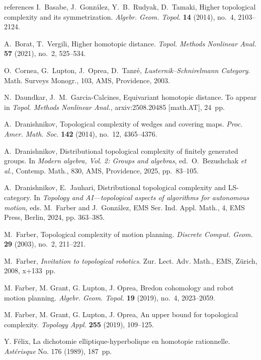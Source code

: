 \documentclass[amscd,amssymb,verbatim,10pt]{amsart}
\numberwithin{equation}{section}
\theoremstyle{plain}
\theoremstyle{definition}
\begin{document}
\begin{thebibliography}{references}
 I.~Basabe, J.~Gonz\'alez, Y.~B.~Rudyak, D.~Tamaki, Higher topological complexity and its symmetrization. \textit{Algebr. Geom. Topol.} \textbf{14} (2014), no.~4, 2103--2124.

 A.~Borat, T.~Vergili, Higher homotopic distance. \emph{Topol. Methods Nonlinear Anal.} \textbf{57} (2021), no.~2, 525--534.

 O.~Cornea, G.~Lupton, J.~Oprea, D.~Tanré, \textit{Lusternik--Schnirelmann Category}. Math. Surveys Monogr., 103, AMS, Providence, 2003.

 N.~Daundkar, J.~M.~Garcia-Calcines, Equivariant homotopic distance. To appear in \emph{Topol. Methods Nonlinear Anal.}, arxiv:2508.20485 [math.AT], 24~pp.

 A.~Dranishnikov, Topological complexity of wedges and covering maps. \emph{Proc. Amer. Math. Soc.} \textbf{142} (2014), no.~12, 4365--4376.

 A.~Dranishnikov, Distributional topological complexity of finitely generated groups. In \emph{Modern algebra, Vol. 2: Groups and algebras}, ed.~O.~Bezushchak \emph{et al.}, Contemp. Math., 830, AMS, Providence, 2025, pp.~83--105.

 A.~Dranishnikov, E.~Jauhari, Distributional topological complexity and LS-category. In \emph{Topology and AI---topological aspects of algorithms for autonomous motion}, eds. M.~Farber and J.~Gonz\'alez, EMS Ser. Ind. Appl. Math., 4, EMS Press, Berlin, 2024, pp. 363--385.

 M.~Farber, Topological complexity of motion planning. \emph{Discrete Comput. Geom.} \textbf{29} (2003), no.~2, 211--221.

 M.~Farber, \emph{Invitation to topological robotics}. Zur. Lect. Adv. Math., EMS, Z\"urich, 2008, x+133~pp.
 
 M. Farber, M. Grant, G. Lupton, J. Oprea, Bredon cohomology and robot motion planning. \emph{Algebr. Geom. Topol.} \textbf{19} (2019), no.~4, 2023--2059.

 M. Farber, M. Grant, G. Lupton, J. Oprea, An upper bound for topological complexity. \emph{Topology Appl.} \textbf{255} (2019), 109--125.

 Y. F\'elix, La dichotomie elliptique-hyperbolique en 
homotopie rationnelle. \emph{Ast\'erisque} No. 176 (1989), 187~pp.


\end{thebibliography}
\end{document}
